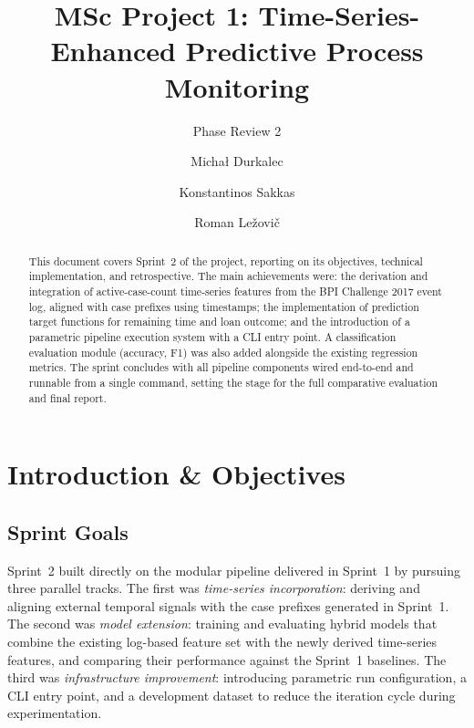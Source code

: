 \documentclass[runningheads]{llncs}
\begin{document}
%
\title{MSc Project 1: Time-Series-Enhanced Predictive Process Monitoring}
\subtitle{Phase Review 2}
%
%
\author{Michał Durkalec \and
    Konstantinos Sakkas \and
    Roman Ležovič
}
%
%
%
\maketitle  %
%
\begin{abstract}
    This document covers Sprint~2 of the project, reporting on its objectives, technical implementation, and retrospective. The main achievements were: the derivation and integration of active-case-count time-series features from the BPI Challenge 2017 event log, aligned with case prefixes using timestamps; the implementation of prediction target functions for remaining time and loan outcome; and the introduction of a parametric pipeline execution system with a CLI entry point. A classification evaluation module (accuracy, F1) was also added alongside the existing regression metrics. The sprint concludes with all pipeline components wired end-to-end and runnable from a single command, setting the stage for the full comparative evaluation and final report.
\end{abstract}
%
%
%
\section{Introduction \& Objectives}

\subsection{Sprint Goals}

Sprint~2 built directly on the modular pipeline delivered in Sprint~1 by pursuing three parallel tracks. The first was \emph{time-series incorporation}: deriving and aligning external temporal signals with the case prefixes generated in Sprint~1. The second was \emph{model extension}: training and evaluating hybrid models that combine the existing log-based feature set with the newly derived time-series features, and comparing their performance against the Sprint~1 baselines. The third was \emph{infrastructure improvement}: introducing parametric run configuration, a CLI entry point, and a development dataset to reduce the iteration cycle during experimentation.
\end{document}
